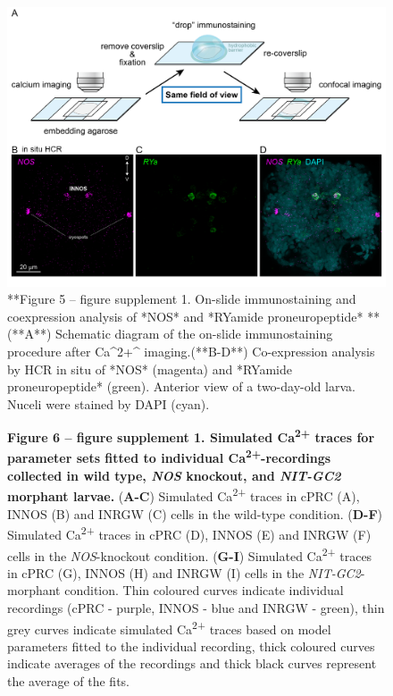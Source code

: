 \documentclass[
  10pt,
  onecolumn]{article}
\begin{document}
\begin{figure}
\includegraphics[width=27.78in]{figures/Fig5_sup1} \caption{**Figure 5 -- figure supplement 1. On-slide immunostaining and coexpression analysis of *NOS* and *RYamide proneuropeptide* ** (**A**) Schematic diagram of the on-slide immunostaining procedure after Ca^2+^ imaging.(**B-D**) Co-expression analysis by HCR in situ of *NOS* (magenta) and *RYamide proneuropeptide* (green). Anterior view of a two-day-old larva. Nuceli were stained by DAPI (cyan). }\label{fig:unnamed-chunk-16}
\end{figure}

\begin{figure}
\centering

\caption{\textbf{Figure 6 -- figure supplement 1. Simulated
Ca\textsuperscript{2+} traces for parameter sets fitted to individual
Ca\textsuperscript{2+}-recordings collected in wild type, \emph{NOS}
knockout, and \emph{NIT-GC2} morphant larvae.} (\textbf{A-C}) Simulated
Ca\textsuperscript{2+} traces in cPRC (A), INNOS (B) and INRGW (C) cells
in the wild-type condition. (\textbf{D-F}) Simulated
Ca\textsuperscript{2+} traces in cPRC (D), INNOS (E) and INRGW (F) cells
in the \emph{NOS}-knockout condition. (\textbf{G-I}) Simulated
Ca\textsuperscript{2+} traces in cPRC (G), INNOS (H) and INRGW (I) cells
in the \emph{NIT-GC2}-morphant condition. Thin coloured curves indicate
individual recordings (cPRC - purple, INNOS - blue and INRGW - green),
thin grey curves indicate simulated Ca\textsuperscript{2+} traces based
on model parameters fitted to the individual recording, thick coloured
curves indicate averages of the recordings and thick black curves
represent the average of the fits.}
\end{figure}
\end{document}
